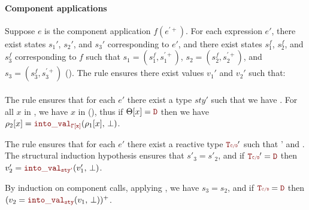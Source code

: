 \begin{skippableproof}
    \paragraph{Component applications}
    Suppose $e$ is the component application
    $f(e^{\prime+})$. For each expression $e'$, there exist states $s_1'$, $s_2'$, and
    $s_3'$ corresponding to $e'$, and there exist states $s^f_1$, $s^f_2$, and $s^f_3$
    corresponding to $f$ such that $s_1 = (s^f_1, s_1^{\prime+})$, $s_2 = (s^f_2,
        s_2^{\prime+})$, and $s_3 = (s^f_3, s_3^{\prime+})$
    ().
    The rule  ensures there exist values
    $v_1'$ and $v_2'$ such that:
    \\\noindent{}\\\noindent
    The rule  ensures that for each $e'$ there
    exist a type $sty'$ such that we have .
    For all $x$ in , we have $x$ in (), thus if $\Theta[x] = \dType$ then
    we have $\rho_2[x] = \intoVal{\tyCtx[x]}{\rho_1[x]}{\bot}$.

    The rule  ensures that for each $e'$
    there exist a reactive type $\rType'$ such that 
    {\rType'} and .
    The structural induction hypothesis ensures that $s'_3 = s'_2$, and if $\rType' =
        \dType$ then $v'_2 = \intoVal{sty'}{v'_1}{\bot}$.

    By induction on component calls, applying , we have $s_3 = s_2$, and if $\rType = \dType$ then $(v_2 = \intoVal
        {sty}{v_1}{\bot})^+$.

    \setcounter{paragraph}{0}
\end{skippableproof}

